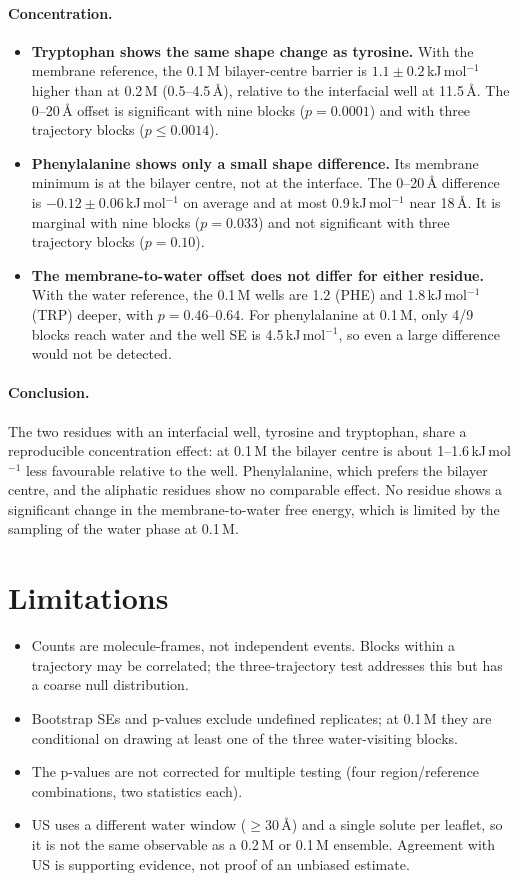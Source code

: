\documentclass[11pt,a4paper]{article}
\newcommand{\kJ}{\,kJ\,mol$^{-1}$}
\begin{document}
\paragraph{Concentration.}
\begin{itemize}
  \item \textbf{Tryptophan shows the same shape change as tyrosine.} With the membrane reference,
  the 0.1\,M bilayer-centre barrier is $1.1 \pm 0.2$\kJ{} higher than at 0.2\,M (0.5--4.5\,\AA),
  relative to the interfacial well at 11.5\,\AA. The 0--20\,\AA{} offset is significant with
  nine blocks ($p = 0.0001$) and with three trajectory blocks ($p \le 0.0014$).
  \item \textbf{Phenylalanine shows only a small shape difference.} Its membrane minimum is at the
  bilayer centre, not at the interface. The 0--20\,\AA{} difference is $-0.12 \pm 0.06$\kJ{}
  on average and at most 0.9\kJ{} near 18\,\AA. It is marginal with nine blocks ($p = 0.033$)
  and not significant with three trajectory blocks ($p = 0.10$).
  \item \textbf{The membrane-to-water offset does not differ for either residue.} With the water
  reference, the 0.1\,M wells are 1.2 (PHE) and 1.8\kJ{} (TRP) deeper, with $p = 0.46$--$0.64$.
  For phenylalanine at 0.1\,M, only 4/9 blocks reach water and the well SE is 4.5\kJ, so even a
  large difference would not be detected.
\end{itemize}

\paragraph{Conclusion.} The two residues with an interfacial well, tyrosine and tryptophan, share
a reproducible concentration effect: at 0.1\,M the bilayer centre is about 1--1.6\kJ{} less
favourable relative to the well. Phenylalanine, which prefers the bilayer centre, and the
aliphatic residues show no comparable effect. No residue shows a significant change in the
membrane-to-water free energy, which is limited by the sampling of the water phase at 0.1\,M.

\section{Limitations}
\begin{itemize}
  \item Counts are molecule-frames, not independent events. Blocks within a trajectory may be
  correlated; the three-trajectory test addresses this but has a coarse null distribution.
  \item Bootstrap SEs and p-values exclude undefined replicates; at 0.1\,M they are conditional
  on drawing at least one of the three water-visiting blocks.
  \item The p-values are not corrected for multiple testing (four region/reference
  combinations, two statistics each).
  \item US uses a different water window ($\ge 30$\,\AA) and a single solute per leaflet, so it
  is not the same observable as a 0.2\,M or 0.1\,M ensemble. Agreement with US is supporting
  evidence, not proof of an unbiased estimate.
\end{itemize}
\end{document}
